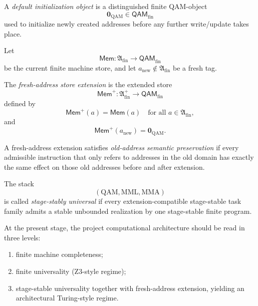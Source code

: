 \begin{definition}\label{def:default-initialization-object-computational-layer}
A \emph{default initialization object} is a distinguished finite QAM-object
\[
\mathbf{0}_{\mathrm{QAM}}\in\mathsf{QAM}_{\mathrm{fin}}
\]
used to initialize newly created addresses before any further write/update takes place.
\end{definition}

\begin{definition}\label{def:fresh-address-store-extension-computational-layer}
Let
\[
\mathsf{Mem}:\mathfrak{A}_{\mathrm{fin}}\to\mathsf{QAM}_{\mathrm{fin}}
\]
be the current finite machine store, and let \(a_{\mathrm{new}}\notin\mathfrak{A}_{\mathrm{fin}}\) be a fresh tag.

The \emph{fresh-address store extension} is the extended store
\[
\mathsf{Mem}^{+}:\mathfrak{A}_{\mathrm{fin}}^{+}\to\mathsf{QAM}_{\mathrm{fin}}
\]
defined by
\[
\mathsf{Mem}^{+}(a)=\mathsf{Mem}(a)
\quad
\text{for all } a\in\mathfrak{A}_{\mathrm{fin}},
\]
and
\[
\mathsf{Mem}^{+}(a_{\mathrm{new}})=\mathbf{0}_{\mathrm{QAM}}.
\]
\end{definition}

\begin{definition}\label{def:old-address-semantic-preservation-computational-layer}
A fresh-address extension satisfies \emph{old-address semantic preservation} if every admissible instruction that only refers to addresses in the old domain has exactly the same effect on those old addresses before and after extension.
\end{definition}

\begin{definition}\label{def:stage-stable-universality-computational-layer}
The stack
\[
(\mathrm{QAM},\mathrm{MML},\mathrm{MMA})
\]
is called \emph{stage-stably universal} if every extension-compatible stage-stable task family admits a stable unbounded realization by one stage-stable finite program.
\end{definition}

\begin{remark}\label{rem:computational-status-reading-computational-layer}
At the present stage, the project computational architecture should be read in three levels:
\begin{enumerate}[leftmargin=2em]
    \item finite machine completeness;
    \item finite universality (Z3-style regime);
    \item stage-stable universality together with fresh-address extension, yielding an architectural Turing-style regime.
\end{enumerate}
\end{remark}

